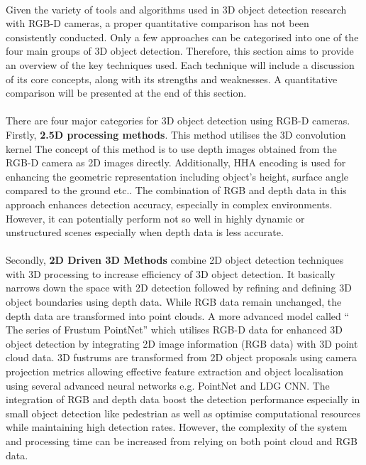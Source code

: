 \paragraph*{}
Given the variety of tools and algorithms used in 3D object detection research with RGB-D cameras, a proper quantitative comparison has not been consistently conducted. Only a few approaches can be categorised into one of the four main groups of 3D object detection. Therefore, this section aims to provide an overview of the key techniques used. Each technique will include a discussion of its core concepts, along with its strengths and weaknesses. A quantitative comparison will be presented at the end of this section.

\paragraph*{}
There are four major categories for 3D object detection using RGB-D cameras. Firstly, \textbf{2.5D processing methods}. This method utilises the 3D convolution kernel The concept of this method is to use depth images obtained from the RGB-D camera as 2D images directly. Additionally, HHA encoding is used for enhancing the geometric representation including object’s height, surface angle compared to the ground etc.\cite{wang2021recent}. The combination of RGB and depth data in this approach enhances detection accuracy, especially in complex environments\cite{wang2021recent}\cite{arican2017object}. However, it can potentially perform not so well in highly dynamic or unstructured scenes especially when depth data is less accurate\cite{wang2021recent}.

\paragraph*{}
Secondly, \textbf{2D Driven 3D Methods} combine 2D object detection techniques with 3D processing to increase efficiency of 3D object detection. It basically narrows down the space with 2D detection followed by refining and defining 3D object boundaries using depth data. While RGB data remain unchanged, the depth data are transformed into point clouds\cite{wang2021recent}.  A more advanced model called “ The series of Frustum PointNet” which utilises RGB-D data for enhanced 3D object detection by integrating 2D image information (RGB data) with 3D point cloud data. 3D fustrums are transformed from 2D object proposals using camera projection metrics allowing effective feature extraction and object localisation using several advanced neural networks e.g. PointNet and LDG CNN. The integration of RGB and depth data boost the detection performance especially in small object detection like pedestrian as well as optimise computational resources while maintaining high detection rates\cite{paigwar2021frustum}. However, the complexity of the system and processing time can be increased from relying on both point cloud and RGB data\cite{tao2023fpvnet}. 

